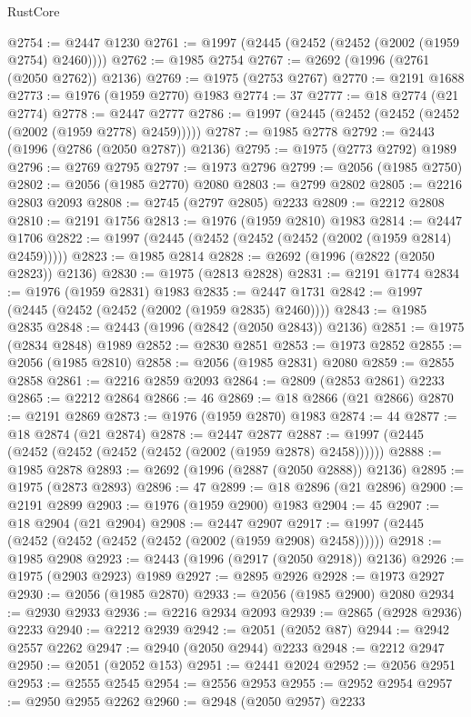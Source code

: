 \begin{lexlean}{RustCore}
\begin{coremodule}
@2754 := @2447 @1230
@2761 := @1997 (@2445 (@2452 (@2452 (@2002 (@1959 @2754) @2460))))
@2762 := @1985 @2754
@2767 := @2692 (@1996 (@2761 (@2050 @2762)) @2136)
@2769 := @1975 (@2753 @2767)
@2770 := @2191 @1688
@2773 := @1976 (@1959 @2770) @1983
@2774 := 37
@2777 := @18 @2774 (@21 @2774)
@2778 := @2447 @2777
@2786 := @1997 (@2445 (@2452 (@2452 (@2452 (@2002 (@1959 @2778) @2459)))))
@2787 := @1985 @2778
@2792 := @2443 (@1996 (@2786 (@2050 @2787)) @2136)
@2795 := @1975 (@2773 @2792) @1989
@2796 := @2769 @2795
@2797 := @1973 @2796
@2799 := @2056 (@1985 @2750)
@2802 := @2056 (@1985 @2770) @2080
@2803 := @2799 @2802
@2805 := @2216 @2803 @2093
@2808 := @2745 (@2797 @2805) @2233
@2809 := @2212 @2808
@2810 := @2191 @1756
@2813 := @1976 (@1959 @2810) @1983
@2814 := @2447 @1706
@2822 := @1997 (@2445 (@2452 (@2452 (@2452 (@2002 (@1959 @2814) @2459)))))
@2823 := @1985 @2814
@2828 := @2692 (@1996 (@2822 (@2050 @2823)) @2136)
@2830 := @1975 (@2813 @2828)
@2831 := @2191 @1774
@2834 := @1976 (@1959 @2831) @1983
@2835 := @2447 @1731
@2842 := @1997 (@2445 (@2452 (@2452 (@2002 (@1959 @2835) @2460))))
@2843 := @1985 @2835
@2848 := @2443 (@1996 (@2842 (@2050 @2843)) @2136)
@2851 := @1975 (@2834 @2848) @1989
@2852 := @2830 @2851
@2853 := @1973 @2852
@2855 := @2056 (@1985 @2810)
@2858 := @2056 (@1985 @2831) @2080
@2859 := @2855 @2858
@2861 := @2216 @2859 @2093
@2864 := @2809 (@2853 @2861) @2233
@2865 := @2212 @2864
@2866 := 46
@2869 := @18 @2866 (@21 @2866)
@2870 := @2191 @2869
@2873 := @1976 (@1959 @2870) @1983
@2874 := 44
@2877 := @18 @2874 (@21 @2874)
@2878 := @2447 @2877
@2887 := @1997 (@2445 (@2452 (@2452 (@2452 (@2452 (@2002 (@1959 @2878) @2458))))))
@2888 := @1985 @2878
@2893 := @2692 (@1996 (@2887 (@2050 @2888)) @2136)
@2895 := @1975 (@2873 @2893)
@2896 := 47
@2899 := @18 @2896 (@21 @2896)
@2900 := @2191 @2899
@2903 := @1976 (@1959 @2900) @1983
@2904 := 45
@2907 := @18 @2904 (@21 @2904)
@2908 := @2447 @2907
@2917 := @1997 (@2445 (@2452 (@2452 (@2452 (@2452 (@2002 (@1959 @2908) @2458))))))
@2918 := @1985 @2908
@2923 := @2443 (@1996 (@2917 (@2050 @2918)) @2136)
@2926 := @1975 (@2903 @2923) @1989
@2927 := @2895 @2926
@2928 := @1973 @2927
@2930 := @2056 (@1985 @2870)
@2933 := @2056 (@1985 @2900) @2080
@2934 := @2930 @2933
@2936 := @2216 @2934 @2093
@2939 := @2865 (@2928 @2936) @2233
@2940 := @2212 @2939
@2942 := @2051 (@2052 @87)
@2944 := @2942 @2557 @2262
@2947 := @2940 (@2050 @2944) @2233
@2948 := @2212 @2947
@2950 := @2051 (@2052 @153)
@2951 := @2441 @2024
@2952 := @2056 @2951
@2953 := @2555 @2545
@2954 := @2556 @2953
@2955 := @2952 @2954
@2957 := @2950 @2955 @2262
@2960 := @2948 (@2050 @2957) @2233

\end{coremodule}
\end{lexlean}
